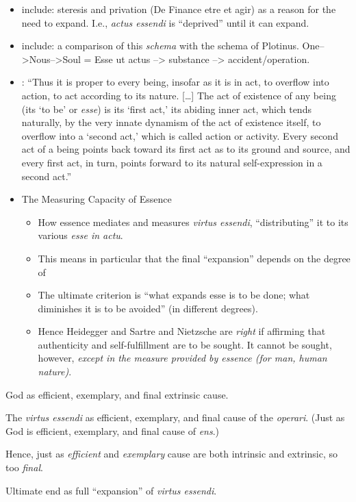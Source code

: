 \begin{DONE}
\begin{NOTES}
\begin{itemize}
  \item include: steresis and privation (De Finance etre et agir) as a reason for the need to expand. I.e., \emph{actus essendi} is ``deprived'' until it can expand.

  \item include: a comparison of this \emph{schema} with the schema of Plotinus. One-->Nous-->Soul = Esse ut actus --> substance --> accident/operation.

  
  \item \cite[64]{clarke:action}: \enquote{Thus it is proper to every being, insofar as it is in act, to overflow into action, to act according to its nature. [\ldots] The act of existence of any being (its \enquote{to be} or \emph{esse}) is its \enquote{first act,} its abiding inner act, which tends naturally, by the very innate dynamism of the act of existence itself, to overflow into a \enquote{second act,} which is called action or activity. Every second act of a being points back toward its first act as to its ground and source, and every first act, in turn, points forward to its natural self-expression in a second act.}

  \item{The Measuring Capacity of Essence}

  \begin{itemize}
    \item How essence mediates and measures \emph{virtus essendi}, \enquote{distributing} it to its various \emph{esse in actu}.

    \item This means in particular that the final \enquote{expansion} depends on the degree of 

    \item The ultimate criterion is \enquote{what expands esse is to be done; what diminishes it is to be avoided} (in different degrees).

    \item Hence Heidegger and Sartre and Nietzsche are \emph{right} if affirming that authenticity and self-fulfillment are to be sought. It cannot be sought, however, \emph{except in the measure provided by essence (for man, human nature)}.
  \end{itemize}
\end{itemize}
	
God as efficient, exemplary, and final extrinsic cause.

The \emph{virtus essendi} as efficient, exemplary, and final cause of the \emph{operari}. (Just as God is efficient, exemplary, and final cause of \emph{ens}.)

Hence, just as \emph{efficient} and \emph{exemplary} cause are both intrinsic and extrinsic, so too \emph{final}.

Ultimate end as full \enquote{expansion} of \emph{virtus essendi}.

\end{NOTES}

\end{DONE}
